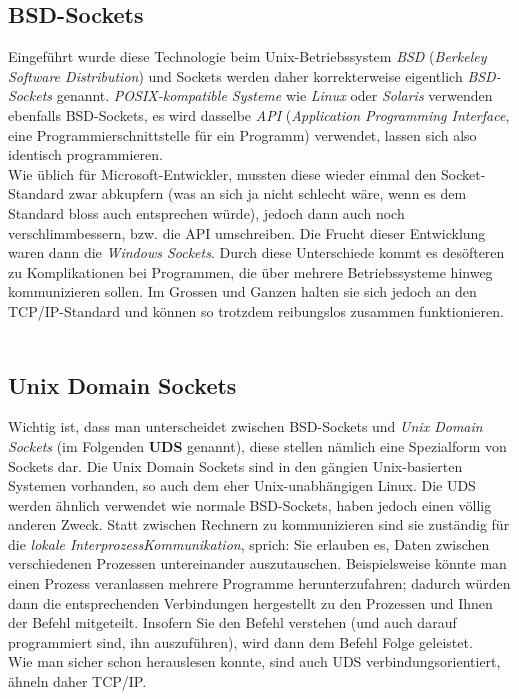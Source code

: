 \documentclass[b5paper,10pt,dvips,fleqn,titlepage,twoside]{book}
\begin{document}
\subsection{BSD-Sockets}
Eingeführt wurde diese Technologie beim Unix-Betriebssystem \emph{BSD} (\textit{Berkeley Software Distribution}) und Sockets werden daher korrekterweise eigentlich \emph{BSD-Sockets} genannt.
\emph{POSIX-kompatible Systeme} wie \emph{Linux} oder \emph{Solaris} verwenden ebenfalls BSD-Sockets, es wird dasselbe \emph{API} (\textit{Application Programming Interface}, eine Programmierschnittstelle für ein Programm) verwendet, lassen sich also identisch programmieren.\\
Wie üblich für Microsoft-Entwickler, mussten diese wieder einmal den Socket-Standard zwar abkupfern (was an sich ja nicht schlecht wäre, wenn es dem Standard bloss auch entsprechen würde), jedoch dann auch noch verschlimmbessern, bzw. die API umschreiben. Die Frucht dieser Entwicklung waren dann die \emph{Windows Sockets}.
Durch diese Unterschiede kommt es desöfteren zu Komplikationen bei Programmen, die über mehrere Betriebssysteme hinweg kommunizieren sollen. Im Grossen und Ganzen halten sie sich jedoch an den TCP/IP-Standard und können so trotzdem reibungslos zusammen funktionieren.\\\\
\subsection{Unix Domain Sockets}
Wichtig ist, dass man unterscheidet zwischen BSD-Sockets und \emph{Unix Domain Sockets} (im Folgenden \textbf{UDS} genannt), diese stellen nämlich eine Spezialform von Sockets dar. Die Unix Domain Sockets sind in den gängien Unix-basierten Systemen vorhanden, so auch dem eher Unix-unabhängigen Linux. Die UDS werden ähnlich verwendet wie normale BSD-Sockets, haben jedoch einen völlig anderen Zweck. Statt zwischen Rechnern zu kommunizieren sind sie zuständig für die \emph{lokale InterprozessKommunikation}, sprich: Sie erlauben es, Daten zwischen verschiedenen Prozessen untereinander auszutauschen. Beispielsweise könnte man einen Prozess veranlassen mehrere Programme herunterzufahren; dadurch würden dann die entsprechenden Verbindungen hergestellt zu den Prozessen und Ihnen der Befehl mitgeteilt. Insofern Sie den Befehl verstehen (und auch darauf programmiert sind, ihn auszuführen), wird dann dem Befehl Folge geleistet.\\
Wie man sicher schon herauslesen konnte, sind auch UDS verbindungsorientiert, ähneln daher TCP/IP.
\end{document}
